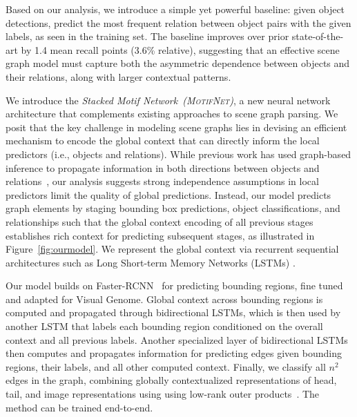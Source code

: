 \documentclass[10pt,twocolumn,letterpaper]{article}
\newcommand{\model}{\textsc{MotifNet}}
\newcommand{\modellong}{Stacked Motif Network}
\newcommand{\term}[1]{\emph{#1}}  %
\begin{document}
Based on our analysis, we introduce a simple yet powerful baseline: given object detections, predict the most frequent relation between object pairs with the given labels, as seen in the training set.
The baseline improves over prior state-of-the-art by 1.4 mean recall points (3.6\% relative), suggesting that an effective scene graph model must capture both the asymmetric dependence between objects and their relations, along with larger contextual patterns.

We introduce the \term{\modellong~(\model)}, a new neural network architecture
that complements existing approaches to scene graph parsing.
We posit that the key challenge in modeling scene graphs lies in devising an efficient mechanism to encode the global context that can directly inform the local predictors (i.e., objects and relations).
While previous work has used graph-based inference to propagate information in both directions between objects and relations~\cite{xu_scene_2017, li2017msdn, li_vip-cnn:_2017}, our analysis suggests strong independence assumptions in local predictors limit the quality of global predictions. %
Instead, our model predicts graph elements by staging bounding box predictions, object classifications, and relationships such that the global context encoding of all previous stages establishes rich context for predicting subsequent stages, as illustrated in Figure~\ref{fig:ourmodel}.
We represent %
the global context via recurrent sequential architectures such as Long Short-term Memory Networks (LSTMs) \cite{Hochreiter:1997:LSM:1246443.1246450}.

Our model builds on Faster-RCNN~\cite{ren_faster_2015}  for predicting bounding regions, fine tuned and adapted for Visual Genome.
Global context across bounding regions is computed and propagated through bidirectional LSTMs, which is then used by another LSTM that labels each bounding region conditioned on the overall context and all previous labels.
Another specialized layer of bidirectional LSTMs then computes and propagates information for predicting edges given bounding regions, their labels, and all other computed context.
Finally, we classify all $n^2$ edges in the graph, combining globally %
contextualized representations of head, tail, and image representations using using low-rank outer products~\cite{Kim2016HadamardPF}.
The method can be trained end-to-end.
\end{document}
